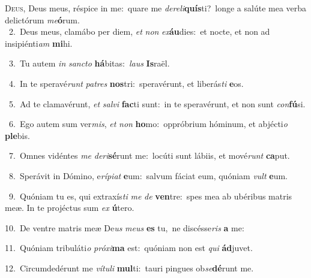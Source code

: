 \lettrine{\initial\textcolor{\initialcolor}{D}}{eus,} Deus meus, réspice in me:~\dagger quare me \textit{de}\-\textit{re}\textit{li}\textbf{quís}ti?~\star longe a salúte mea verba delictórum \textit{me}\-\textbf{ó}rum.\\
{\numbfont\textcolor{\numbcolor}{~2.}}~Deus meus, clamábo per diem, \textit{et} \textit{non} \textit{ex}\-\textbf{áu}dies:~\star et nocte, et non ad insipiénti\textit{am} \textbf{mi}\-hi.\par
{\numbfont\textcolor{\numbcolor}{~3.}}~Tu autem \textit{in} \textit{sanc}\-\textit{to} \textbf{há}\-bitas:~\star \textit{laus} \textbf{Is}\-raël.\par
{\numbfont\textcolor{\numbcolor}{~4.}}~In te speravé\textit{runt} \textit{pa}\-\textit{tres} \textbf{nos}\-tri:~\star speravérunt, et liberás\textit{ti} \textbf{e}\-os.\par
{\numbfont\textcolor{\numbcolor}{~5.}}~Ad te clamavérunt, \textit{et} \textit{sal}\-\textit{vi} \textbf{fac}\-ti sunt:~\star in te speravérunt, et non sunt \textit{con}\-\textbf{fú}si.\par
{\numbfont\textcolor{\numbcolor}{~6.}}~Ego autem sum ver\-\textit{mis}\-, \textit{et} \textit{non} \textbf{ho}\-mo:~\star oppróbrium hóminum, et abjécti\textit{o} \textbf{ple}\-bis.\par
{\numbfont\textcolor{\numbcolor}{~7.}}~Omnes vidéntes \textit{me} \textit{de}\-\textit{ri}\textbf{sé}runt me:~\star locúti sunt lábiis, et mové\textit{runt} \textbf{ca}\-put.\par
{\numbfont\textcolor{\numbcolor}{~8.}}~Sperávit in Dómino, e\-\textit{rí}\-\textit{pi}\textit{at} \textbf{e}\-um:~\star salvum fáciat eum, quóniam \textit{vult} \textbf{e}\-um.\par
{\numbfont\textcolor{\numbcolor}{~9.}}~Quóniam tu es, qui extraxís\textit{ti} \textit{me} \textit{de} \textbf{ven}\-tre:~\star spes mea ab ubéribus matris meæ. In te projéctus sum \textit{ex} \textbf{ú}\-tero.\par
{\numbfont\textcolor{\numbcolor}{10.}}~De ventre matris meæ De\textit{us} \textit{me}\-\textit{us} \textbf{es} tu,~\star ne discésse\textit{ris} \textbf{a} me:\par
{\numbfont\textcolor{\numbcolor}{11.}}~Quóniam tribuláti\textit{o} \textit{pró}\-\textit{xi}\textbf{ma} est:~\star quóniam non est \textit{qui} \textbf{ád}\-juvet.\par
{\numbfont\textcolor{\numbcolor}{12.}}~Circumdedérunt me \textit{ví}\-\textit{tu}\textit{li} \textbf{mul}\-ti:~\star tauri pingues ob\-\textit{se}\-\textbf{dé}runt me.\par
